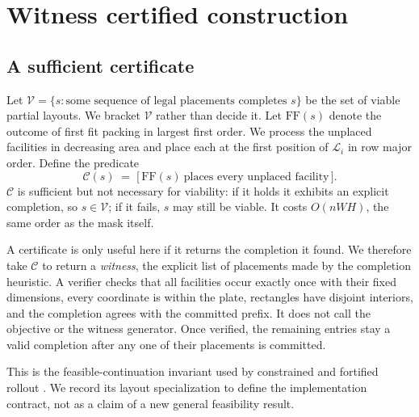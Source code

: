\documentclass[preprint,12pt,authoryear]{elsarticle}
\newcommand{\cL}{\mathcal{L}}
\newcommand{\cV}{\mathcal{V}}
\newcommand{\cC}{\mathcal{C}}
\begin{document}
\section{Witness certified construction}
\label{sec:certified}

\subsection{A sufficient certificate}
Let $\cV=\{s:\text{some sequence of legal placements completes }s\}$ be the
set of viable partial layouts. We bracket $\cV$ rather than decide it. Let
$\mathrm{FF}(s)$ denote the outcome of
first fit packing in largest first order. We process the unplaced facilities in decreasing
area and place each at the first position of $\cL_i$ in row major order. Define
the predicate
\begin{equation}
\cC(s)\;=\;\big[\,\mathrm{FF}(s)\ \text{places every unplaced facility}\,\big].
\end{equation}
$\cC$ is sufficient but not necessary for viability: if it holds it exhibits an
explicit completion, so $s\in\cV$; if it fails, $s$ may still be viable. It costs
$O(nWH)$, the same order as the mask itself.

A certificate is only useful here if it returns the completion it found. We
therefore take $\cC$ to return a \emph{witness}, the explicit list of placements
made by the completion heuristic. A verifier checks that all facilities occur
exactly once with their fixed dimensions, every coordinate is within the plate,
rectangles have disjoint interiors, and the completion agrees with the committed
prefix. It does not call the objective or the witness generator. Once verified,
the remaining entries stay a valid completion after any one of their placements
is committed.

This is the feasible-continuation invariant used by constrained and fortified
rollout \citep{Bertsekas2005Constrained,Bertsekas2020Constrained}. We record its
layout specialization to define the implementation contract, not as a claim of
a new general feasibility result.
\end{document}
